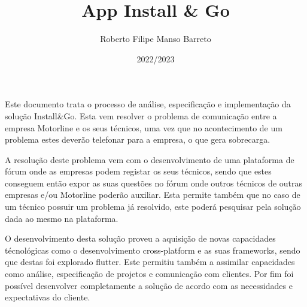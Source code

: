 \documentclass[a4paper,12pt,twoside]{book}
\title{App Install \& Go}
\author{Roberto Filipe Manso Barreto}
\date{2022/2023}
\begin{document}
\frontmatter

\maketitle


\begin{resumo}
Este documento trata o processo de análise, especificação e implementação da solução Install\&Go. Esta vem resolver o problema de comunicação entre a empresa Motorline e os seus técnicos, uma vez que no acontecimento de um problema estes deverão telefonar para a empresa, o que gera sobrecarga.

A resolução deste problema vem com o desenvolvimento de uma plataforma de fórum onde as empresas podem registar os seus técnicos, sendo que estes conseguem então expor as suas questões no fórum onde outros técnicos de outras empresas e/ou Motorline poderão auxiliar. Esta permite também que no caso de um técnico possuir um problema já resolvido, este poderá pesquisar pela solução dada ao mesmo na plataforma.

O desenvolvimento desta solução proveu a aquisição de novas capacidades técnológicas como o desenvolvimento cross-platform e as suas frameworks, sendo que destas foi explorado flutter. Este permitiu também a assimilar capacidades como análise, especificação de projetos e comunicação com clientes. Por fim foi possível desenvolver completamente a solução de acordo com as necessidades e expectativas do cliente.



\end{resumo}
\end{document}
